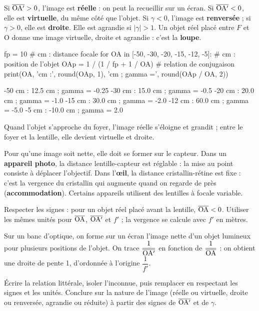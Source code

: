 \begin{propriete}
Si $\overline{\mathrm{OA'}}>0$, l'image est \textbf{réelle} : on peut la recueillir sur un écran. Si $\overline{\mathrm{OA'}}<0$, elle est \textbf{virtuelle}, du même côté que l'objet.
Si $\gamma<0$, l'image est \textbf{renversée} ; si $\gamma>0$, elle est \textbf{droite}. Elle est agrandie si $|\gamma|>1$. Un objet réel placé entre $F$ et O donne une
image virtuelle, droite et agrandie : c'est la \textbf{loupe}.
\end{propriete}
\par{}
\begin{python}
fp = 10                                   # cm : distance focale
for OA in [-50, -30, -20, -15, -12, -5]:  # cm : position de l'objet
    OAp = 1 / (1 / fp + 1 / OA)           # relation de conjugaison
    print(OA, 'cm :', round(OAp, 1), 'cm ; gamma =', round(OAp / OA, 2))
\end{python}
\begin{console}
-50 cm : 12.5 cm ; gamma = -0.25
-30 cm : 15.0 cm ; gamma = -0.5
-20 cm : 20.0 cm ; gamma = -1.0
-15 cm : 30.0 cm ; gamma = -2.0
-12 cm : 60.0 cm ; gamma = -5.0
-5 cm : -10.0 cm ; gamma = 2.0
\end{console}
\noindent{} Quand l'objet s'approche du foyer, l'image réelle s'éloigne et grandit ; entre le foyer et la lentille, elle
devient virtuelle et droite.
\begin{propriete}
Pour qu'une image soit nette, elle doit se former sur le capteur. Dans un \textbf{appareil photo}, la distance lentille-capteur est
réglable : la mise au point consiste à déplacer l'objectif. Dans l'\textbf{œil}, la distance cristallin-rétine est fixe : c'est la vergence du
cristallin qui augmente quand on regarde de près (\textbf{accommodation}). Certains appareils utilisent des lentilles à focale variable.
\end{propriete}
\begin{attention}
Respecter les signes : pour un objet réel placé avant la lentille, $\overline{\mathrm{OA}}<0$. Utiliser les mêmes unités pour $\overline{\mathrm{OA}}$, $\overline{\mathrm{OA'}}$ et $f'$ ; la vergence
se calcule avec $f'$ en mètres.
\end{attention}
\begin{experience}
Sur un banc d'optique, on forme sur un écran l'image nette d'un objet lumineux pour plusieurs positions de l'objet. On trace
$\dfrac{1}{\overline{\mathrm{OA'}}}$ en fonction de $\dfrac{1}{\overline{\mathrm{OA}}}$ : on obtient une droite de pente 1, d'ordonnée à l'origine $\dfrac{1}{f'}$.
\end{experience}
\begin{rediger}
Écrire la relation littérale, isoler l'inconnue, puis remplacer en respectant les signes et les unités. Conclure sur la nature de
l'image (réelle ou virtuelle, droite ou renversée, agrandie ou réduite) à partir des signes de $\overline{\mathrm{OA'}}$ et de $\gamma$.
\end{rediger}
\exercices

